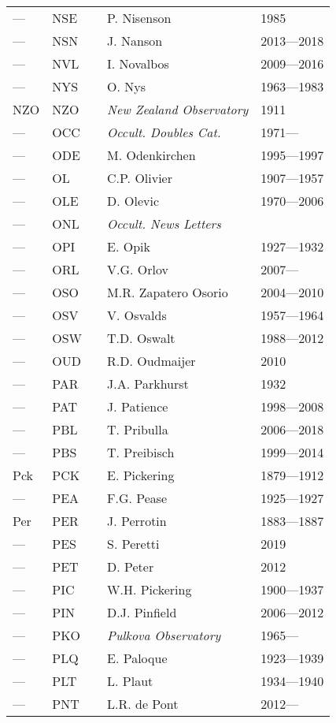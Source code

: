\begin{longtable}{l|l|c|p{59mm}|l}
--- & NSE &   & P. Nisenson & 1985 \\
--- & NSN &   & J. Nanson & 2013---2018 \\
--- & NVL &   & I. Novalbos & 2009---2016 \\
--- & NYS &   & O. Nys & 1963---1983 \\
NZO & NZO &   & \emph{New Zealand Observatory} & 1911 \\\midrule
--- & OCC &   & \emph{Occult. Doubles Cat.} & 1971--- \\
--- & ODE &   & M. Odenkirchen & 1995---1997 \\
--- & OL  &   & C.P. Olivier & 1907---1957 \\
--- & OLE &   & D. Olevic & 1970---2006 \\
--- & ONL &   & \emph{Occult. News Letters} & \\
--- & OPI &   & E. Opik & 1927---1932 \\
--- & ORL &   & V.G. Orlov & 2007--- \\
--- & OSO &   & M.R. Zapatero Osorio & 2004---2010 \\
--- & OSV &   & V. Osvalds & 1957---1964 \\
--- & OSW &   & T.D. Oswalt & 1988---2012 \\
--- & OUD &   & R.D. Oudmaijer & 2010 \\\midrule
--- & PAR &   & J.A. Parkhurst & 1932 \\
--- & PAT &   & J. Patience & 1998---2008 \\
--- & PBL &   & T. Pribulla & 2006---2018 \\
--- & PBS &   & T. Preibisch & 1999---2014 \\
Pck & PCK &   & E. Pickering & 1879---1912 \\
--- & PEA &   & F.G. Pease & 1925---1927 \\
Per & PER &   & J. Perrotin & 1883---1887 \\
--- & PES &   & S. Peretti & 2019 \\
--- & PET &   & D. Peter & 2012 \\
--- & PIC &   & W.H. Pickering & 1900---1937 \\
--- & PIN &   & D.J. Pinfield & 2006---2012 \\
--- & PKO &   & \emph{Pulkova Observatory} & 1965--- \\
--- & PLQ &   & E. Paloque & 1923---1939 \\
--- & PLT &   & L. Plaut & 1934---1940 \\
--- & PNT &   & L.R. de Pont & 2012--- \\

\end{longtable}
